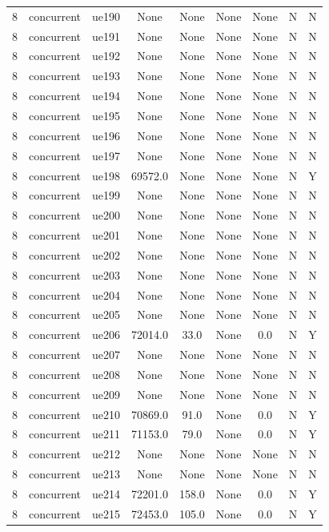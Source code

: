 \begin{table}[ht]
\begin{tabular}{|c|c|c|c|c|c|c|c|c|}
8 & concurrent & ue190 & None & None & None & None & N & N \\
8 & concurrent & ue191 & None & None & None & None & N & N \\
8 & concurrent & ue192 & None & None & None & None & N & N \\
8 & concurrent & ue193 & None & None & None & None & N & N \\
8 & concurrent & ue194 & None & None & None & None & N & N \\
8 & concurrent & ue195 & None & None & None & None & N & N \\
8 & concurrent & ue196 & None & None & None & None & N & N \\
8 & concurrent & ue197 & None & None & None & None & N & N \\
8 & concurrent & ue198 & 69572.0 & None & None & None & N & Y \\
8 & concurrent & ue199 & None & None & None & None & N & N \\
8 & concurrent & ue200 & None & None & None & None & N & N \\
8 & concurrent & ue201 & None & None & None & None & N & N \\
8 & concurrent & ue202 & None & None & None & None & N & N \\
8 & concurrent & ue203 & None & None & None & None & N & N \\
8 & concurrent & ue204 & None & None & None & None & N & N \\
8 & concurrent & ue205 & None & None & None & None & N & N \\
8 & concurrent & ue206 & 72014.0 & 33.0 & None & 0.0 & N & Y \\
8 & concurrent & ue207 & None & None & None & None & N & N \\
8 & concurrent & ue208 & None & None & None & None & N & N \\
8 & concurrent & ue209 & None & None & None & None & N & N \\
8 & concurrent & ue210 & 70869.0 & 91.0 & None & 0.0 & N & Y \\
8 & concurrent & ue211 & 71153.0 & 79.0 & None & 0.0 & N & Y \\
8 & concurrent & ue212 & None & None & None & None & N & N \\
8 & concurrent & ue213 & None & None & None & None & N & N \\
8 & concurrent & ue214 & 72201.0 & 158.0 & None & 0.0 & N & Y \\
8 & concurrent & ue215 & 72453.0 & 105.0 & None & 0.0 & N & Y \\

\end{tabular}
\end{table}
